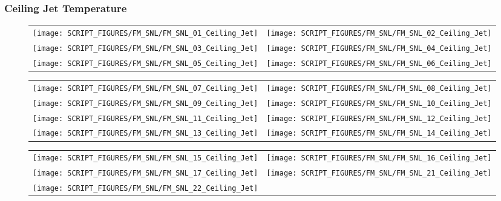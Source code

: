 \clearpage

\subsubsection{Ceiling Jet Temperature}

\begin{figure}[!ht]
\begin{tabular*}{\textwidth}{l@{\extracolsep{\fill}}r}
\texttt{[image: SCRIPT\_FIGURES/FM\_SNL/FM\_SNL\_01\_Ceiling\_Jet]} &
\texttt{[image: SCRIPT\_FIGURES/FM\_SNL/FM\_SNL\_02\_Ceiling\_Jet]} \\
\texttt{[image: SCRIPT\_FIGURES/FM\_SNL/FM\_SNL\_03\_Ceiling\_Jet]} &
\texttt{[image: SCRIPT\_FIGURES/FM\_SNL/FM\_SNL\_04\_Ceiling\_Jet]} \\
\texttt{[image: SCRIPT\_FIGURES/FM\_SNL/FM\_SNL\_05\_Ceiling\_Jet]} &
\texttt{[image: SCRIPT\_FIGURES/FM\_SNL/FM\_SNL\_06\_Ceiling\_Jet]} \\
\end{tabular*}
\label{FM_SNL_Ceiling_Jet_1}
\end{figure}

\newpage

\begin{figure}[!ht]
\begin{tabular*}{\textwidth}{l@{\extracolsep{\fill}}r}
\texttt{[image: SCRIPT\_FIGURES/FM\_SNL/FM\_SNL\_07\_Ceiling\_Jet]} &
\texttt{[image: SCRIPT\_FIGURES/FM\_SNL/FM\_SNL\_08\_Ceiling\_Jet]} \\
\texttt{[image: SCRIPT\_FIGURES/FM\_SNL/FM\_SNL\_09\_Ceiling\_Jet]} &
\texttt{[image: SCRIPT\_FIGURES/FM\_SNL/FM\_SNL\_10\_Ceiling\_Jet]} \\
\texttt{[image: SCRIPT\_FIGURES/FM\_SNL/FM\_SNL\_11\_Ceiling\_Jet]} &
\texttt{[image: SCRIPT\_FIGURES/FM\_SNL/FM\_SNL\_12\_Ceiling\_Jet]} \\
\texttt{[image: SCRIPT\_FIGURES/FM\_SNL/FM\_SNL\_13\_Ceiling\_Jet]} &
\texttt{[image: SCRIPT\_FIGURES/FM\_SNL/FM\_SNL\_14\_Ceiling\_Jet]} \\
\end{tabular*}
\label{FM_SNL_Ceiling_Jet_2}
\end{figure}

\begin{figure}[!ht]
\begin{tabular*}{\textwidth}{l@{\extracolsep{\fill}}r}
\texttt{[image: SCRIPT\_FIGURES/FM\_SNL/FM\_SNL\_15\_Ceiling\_Jet]} &
\texttt{[image: SCRIPT\_FIGURES/FM\_SNL/FM\_SNL\_16\_Ceiling\_Jet]} \\
\texttt{[image: SCRIPT\_FIGURES/FM\_SNL/FM\_SNL\_17\_Ceiling\_Jet]} &
\texttt{[image: SCRIPT\_FIGURES/FM\_SNL/FM\_SNL\_21\_Ceiling\_Jet]} \\
\texttt{[image: SCRIPT\_FIGURES/FM\_SNL/FM\_SNL\_22\_Ceiling\_Jet]} \\
\end{tabular*}
\label{FM_SNL_Ceiling_Jet_3}
\end{figure}

